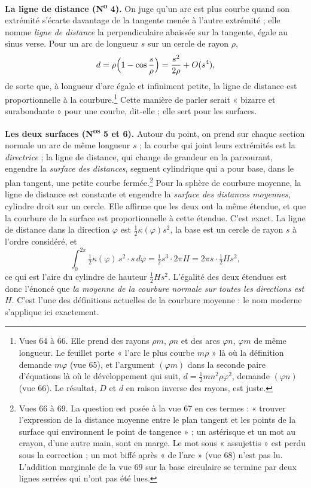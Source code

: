 \documentclass[11pt,a4paper]{article}
\begin{document}
\textbf{La ligne de distance (N\textsuperscript{o} 4).} On juge qu'un arc est
plus courbe quand son extrémité s'écarte davantage de la tangente menée à
l'autre extrémité ; elle nomme \emph{ligne de distance} la perpendiculaire
abaissée sur la tangente, égale au sinus verse. Pour un arc de longueur $s$ sur
un cercle de rayon $\rho$,
\[
d = \rho\Bigl(1 - \cos\frac{s}{\rho}\Bigr) = \frac{s^2}{2\rho} + O(s^4),
\]
de sorte que, à longueur d'arc égale et infiniment petite, la ligne de distance
est proportionnelle à la courbure.\footnote{Vues 64 à 66. Elle prend des rayons
$\rho m$, $\rho n$ et des arcs $\varphi n$, $\varphi m$ de même longueur. Le
feuillet porte « l'arc le plus courbe $m\rho$ » là où la définition demande
$m\varphi$ (vue 65), et l'argument $(\varphi m)$ dans la seconde paire
d'équations là où le développement qui suit, $d = \frac12 m n^2\rho\varphi^2$,
demande $(\varphi n)$ (vue 66). Le résultat, $D$ et $d$ en raison inverse des
rayons, est juste.} Cette manière de parler serait « bizarre et surabondante »
pour une courbe, dit-elle ; elle sert pour les surfaces.

\textbf{Les deux surfaces (N\textsuperscript{os} 5 et 6).} Autour du point, on
prend sur chaque section normale un arc de même longueur $s$ ; la courbe qui
joint leurs extrémités est la \emph{directrice} ; la ligne de distance, qui
change de grandeur en la parcourant, engendre la \emph{surface des distances},
segment cylindrique qui a pour base, dans le plan tangent, une petite courbe
fermée.\footnote{Vues 66 à 69. La question est posée à la vue 67 en ces termes :
« trouver l'expression de la distance moyenne entre le plan tangent et les points
de la surface qui environnent le point de tangence » ; un astérisque et un mot au
crayon, d'une autre main, sont en marge. Le mot sous « assujettis » est perdu
sous la correction ; un mot biffé après « de l'arc » (vue 68) n'est pas lu.
L'addition marginale de la vue 69 sur la base circulaire se termine par deux
lignes serrées qui n'ont pas été lues.} Pour la sphère de courbure moyenne, la
ligne de distance est constante et engendre la \emph{surface des distances
moyennes}, cylindre droit sur un cercle. Elle affirme que les deux ont la même
étendue, et que la courbure de la surface est proportionnelle à cette étendue.
C'est exact. La ligne de distance dans la direction $\varphi$ est
$\frac12\kappa(\varphi)s^2$, la base est un cercle de rayon $s$ à l'ordre
considéré, et
\[
\int_0^{2\pi} \tfrac12\kappa(\varphi)\,s^2\cdot s\,d\varphi
= \tfrac12 s^3\cdot 2\pi H
= 2\pi s\cdot\tfrac12 H s^2 ,
\]
ce qui est l'aire du cylindre de hauteur $\frac12 H s^2$. L'égalité des deux
étendues est donc l'énoncé que \emph{la moyenne de la courbure normale sur
toutes les directions est $H$}. C'est l'une des définitions actuelles de la
courbure moyenne : le nom moderne s'applique ici exactement.
\end{document}
